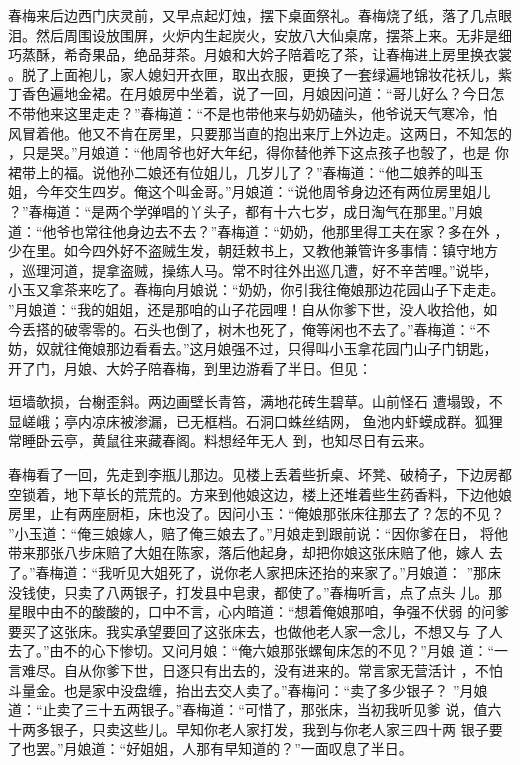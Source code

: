 春梅来后边西门庆灵前，又早点起灯烛，摆下桌面祭礼。春梅烧了纸，落了几点眼
泪。然后周围设放围屏，火炉内生起炭火，安放八大仙桌席，摆茶上来。无非是细
巧蒸酥，希奇果品，绝品芽茶。月娘和大妗子陪着吃了茶，让春梅进上房里换衣裳
。脱了上面袍儿，家人媳妇开衣匣，取出衣服，更换了一套绿遍地锦妆花袄儿，紫
丁香色遍地金裙。在月娘房中坐着，说了一回，月娘因问道：“哥儿好么？今日怎
不带他来这里走走？”春梅道：“不是也带他来与奶奶磕头，他爷说天气寒冷，怕
风冒着他。他又不肯在房里，只要那当直的抱出来厅上外边走。这两日，不知怎的
，只是哭。”月娘道：“他周爷也好大年纪，得你替他养下这点孩子也彀了，也是
你裙带上的福。说他孙二娘还有位姐儿，几岁儿了？”春梅道：“他二娘养的叫玉
姐，今年交生四岁。俺这个叫金哥。”月娘道：“说他周爷身边还有两位房里姐儿
？”春梅道：“是两个学弹唱的丫头子，都有十六七岁，成日淘气在那里。”月娘
道：“他爷也常往他身边去不去？”春梅道：“奶奶，他那里得工夫在家？多在外
，少在里。如今四外好不盗贼生发，朝廷敕书上，又教他兼管许多事情：镇守地方
，巡理河道，提拿盗贼，操练人马。常不时往外出巡几遭，好不辛苦哩。”说毕，
小玉又拿茶来吃了。春梅向月娘说：“奶奶，你引我往俺娘那边花园山子下走走。
”月娘道：“我的姐姐，还是那咱的山子花园哩！自从你爹下世，没人收拾他，如
今丢搭的破零零的。石头也倒了，树木也死了，俺等闲也不去了。”春梅道：“不
妨，奴就往俺娘那边看看去。”这月娘强不过，只得叫小玉拿花园门山子门钥匙，
开了门，月娘、大妗子陪春梅，到里边游看了半日。但见：

垣墙欹损，台榭歪斜。两边画壁长青笞，满地花砖生碧草。山前怪石
遭塌毁，不显嵯峨；亭内凉床被渗漏，已无框档。石洞口蛛丝结网，
鱼池内虾蟆成群。狐狸常睡卧云亭，黄鼠往来藏春阁。料想经年无人
到，也知尽日有云来。

春梅看了一回，先走到李瓶儿那边。见楼上丢着些折桌、坏凳、破椅子，下边房都
空锁着，地下草长的荒荒的。方来到他娘这边，楼上还堆着些生药香料，下边他娘
房里，止有两座厨柜，床也没了。因问小玉：“俺娘那张床往那去了？怎的不见？
”小玉道：“俺三娘嫁人，赔了俺三娘去了。”月娘走到跟前说：“因你爹在日，
将他带来那张八步床赔了大姐在陈家，落后他起身，却把你娘这张床赔了他，嫁人
去了。”春梅道：“我听见大姐死了，说你老人家把床还抬的来家了。”月娘道：
”那床没钱使，只卖了八两银子，打发县中皂隶，都使了。”春梅听言，点了点头
儿。那星眼中由不的酸酸的，口中不言，心内暗道：“想着俺娘那咱，争强不伏弱
的问爹要买了这张床。我实承望要回了这张床去，也做他老人家一念儿，不想又与
了人去了。”由不的心下惨切。又问月娘：“俺六娘那张螺甸床怎的不见？”月娘
道：“一言难尽。自从你爹下世，日逐只有出去的，没有进来的。常言家无营活计
，不怕斗量金。也是家中没盘缠，抬出去交人卖了。”春梅问：“卖了多少银子？
”月娘道：“止卖了三十五两银子。”春梅道：“可惜了，那张床，当初我听见爹
说，值六十两多银子，只卖这些儿。早知你老人家打发，我到与你老人家三四十两
银子要了也罢。”月娘道：“好姐姐，人那有早知道的？”一面叹息了半日。

